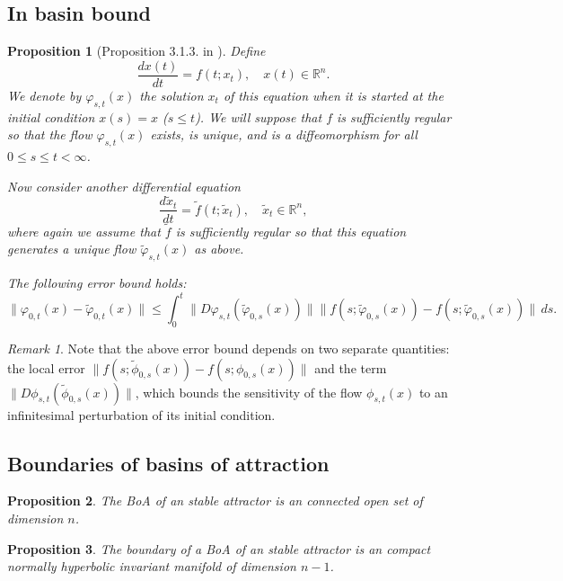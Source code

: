 \documentclass{article}
\newtheorem{proposition}{Proposition}
\theoremstyle{definition}
\theoremstyle{remark}
\newtheorem{remark}{Remark}
\newcounter{ct}
\begin{document}
\subsection{In basin bound}\label{sec:313}
\begin{proposition}[Proposition 3.1.3. in \citep{vanhandel2007filtering}]\label{prop:313}
Define 
\[
\frac{d x(t)}{d t} = f(t; x_t), \quad x(t) \in \mathbb{R}^n.
\]
We denote by $\varphi_{s,t}(x)$ the solution $x_t$ of this equation when it is started at the initial condition $x(s) = x$ ($s \leq t$). We will suppose that $f$ is sufficiently regular so that the flow $\varphi_{s,t}(x)$ exists, is unique, and is a diffeomorphism for all $0 \leq s \leq t < \infty$.

Now consider another differential equation 
\[
\frac{d \tilde{x}_t}{d t} = \tilde{f}(t; \tilde{x}_t), \quad \tilde{x}_t \in \mathbb{R}^n,
\]
where again we assume that $\tilde{f}$ is sufficiently regular so that this equation generates a unique flow $\tilde{\varphi}_{s,t}(x)$ as above.


The following error bound holds:
\[
\|\varphi_{0,t}(x) - \tilde{\varphi}_{0,t}(x)\| \leq \int_0^t \|D\varphi_{s,t}(\tilde{\varphi}_{0,s}(x))\| \|f(s; \tilde{\varphi}_{0,s}(x)) - f(s; \tilde{\varphi}_{0,s}(x))\| \, ds.
\]
\end{proposition}


\begin{remark}\label{rem:313}
Note that the above error bound depends on two separate quantities: 
the local error \( \| f(s; \tilde{\phi}_{0,s}(x)) - f(s; \phi_{0,s}(x)) \| \) 
and 
the term \( \| D\phi_{s,t}(\tilde{\phi}_{0,s}(x)) \| \), which bounds the sensitivity of the flow \( \phi_{s,t}(x) \) to an infinitesimal perturbation of its initial condition.
\end{remark}



\subsection{Boundaries of basins of attraction}\label{sec:boaboundary}

\begin{proposition}
The BoA of an stable attractor is an connected open set of dimension $n$. %
\end{proposition}


\begin{proposition}
The boundary of a BoA of an stable attractor is an compact normally hyperbolic invariant manifold of dimension $n-1$. %
\end{proposition}
\end{document}
